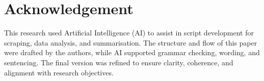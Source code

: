 \documentclass[a4paper, conference]{IEEEtran}
\begin{document}
\section*{Acknowledgement}

This research used Artificial Intelligence (AI) to assist in script development for scraping, data analysis, and summarisation. The structure and flow of this paper were drafted by the authors, while AI supported grammar checking, wording, and sentencing. The final version was refined to ensure clarity, coherence, and alignment with research objectives.



\end{document}

